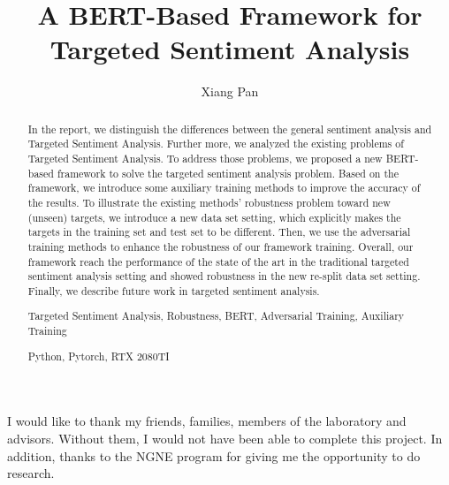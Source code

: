 \documentclass[fyp]{socreport}
\begin{document}
\title{A BERT-Based Framework for Targeted Sentiment Analysis}
\author{Xiang Pan}


\maketitle
\begin{abstract}
In the report, we distinguish the differences between the general sentiment analysis and Targeted Sentiment Analysis. Further more, we analyzed the existing problems of Targeted Sentiment Analysis. To address those problems, we proposed a new BERT-based framework to solve the targeted sentiment analysis problem. Based on the framework, we introduce some auxiliary training methods to improve the accuracy of the results. To illustrate the existing methods' robustness problem toward new (unseen) targets, we introduce a new data set setting, which explicitly makes the targets in the training set and test set to be different. Then, we use the adversarial training methods to enhance the robustness of our framework training. Overall, our framework reach the performance of the state of the art in the traditional targeted sentiment analysis setting and showed robustness in the new re-split data set setting. Finally, we describe future work in targeted sentiment analysis.


\begin{keywords}
	Targeted Sentiment Analysis, Robustness, BERT, Adversarial Training, Auxiliary Training
\end{keywords}
\begin{implement}
	Python, Pytorch, RTX 2080TI
\end{implement}
\end{abstract}

\begin{acknowledgement}
   I would like to thank my friends, families, members of the laboratory and advisors.
   Without them, I would not have been able to complete this project.
   In addition, thanks to the NGNE program for giving me the opportunity to do research.
\end{acknowledgement}
\end{document}
